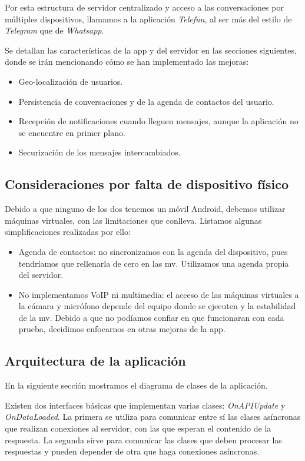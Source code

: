 \documentclass[]{article}
\begin{document}
Por esta estructura de servidor centralizado y acceso a las conversaciones por múltiples dispositivos, llamamos a la aplicación \textit{Telefun}, al ser más del estilo de \textit{Telegram} que de \textit{Whatsapp}.

Se detallan las características de la app y del servidor en las secciones siguientes, donde se irán mencionando cómo se han implementado las mejoras:
\begin{itemize}
	\item Geo-localización de usuarios.
	\item Persistencia de conversaciones y de la agenda de contactos del usuario.
	\item Recepción de notificaciones cuando lleguen mensajes, aunque la aplicación no se encuentre en primer plano.
	\item Securización de los mensajes intercambiados.
\end{itemize}


\subsection{Consideraciones por falta de dispositivo físico}

Debido a que ninguno de los dos tenemos un móvil Android, debemos utilizar máquinas virtuales, con las limitaciones que conlleva. Listamos algunas simplificaciones realizadas por ello:

\begin{itemize}
	\item Agenda de contactos: no sincronizamos con la agenda del dispositivo, pues tendríamos que rellenarla de cero en las mv. Utilizamos una agenda propia del servidor.
	\item No implementamos VoIP ni multimedia: el acceso de las máquinas virtuales a la cámara y micrófono depende del equipo donde se ejecuten y la estabilidad de la mv. Debido a que no podíamos confiar en que funcionaran con cada prueba, decidimos enfocarnos en otras mejoras de la app.
\end{itemize}

\subsection{Arquitectura de la aplicación}

En la siguiente sección mostramos el diagrama de clases de la aplicación.

\hfill

Existen dos interfaces básicas que implementan varias clases: \textit{OnAPIUpdate} y \textit{OnDataLoaded}. La primera se utiliza para comunicar entre sí las clases asíncronas que realizan conexiones al servidor, con las que esperan el contenido de la respuesta. La segunda sirve para comunicar las clases que deben procesar las respuestas y pueden depender de otra que haga conexiones asíncronas.
\end{document}
